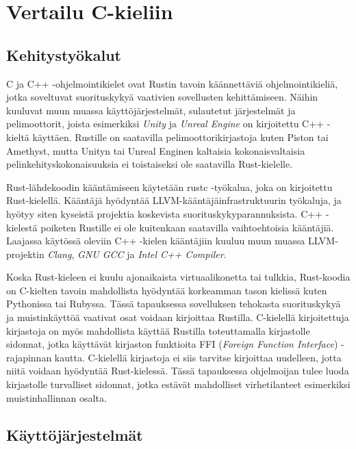 \documentclass[finnish]{tktltiki2}
\theoremstyle{definition}
\theoremstyle{remark}
\begin{document}
\section{Vertailu C-kieliin}

\subsection{Kehitystyökalut}

C ja C++ -ohjelmointikielet ovat Rustin tavoin käännettäviä ohjelmointikieliä, jotka soveltuvat suorituskykyä vaativien sovellusten kehittämiseen. Näihin kuuluvat muun muassa käyttöjärjestelmät, sulautetut järjestelmät ja pelimoottorit, joista esimerkiksi \textit{Unity} ja \textit{Unreal Engine} on kirjoitettu C++ -kieltä käyttäen. Rustille on saatavilla pelimoottorikirjastoja kuten Piston tai Amethyst, mutta Unityn tai Unreal Enginen kaltaisia kokonaisvaltaisia pelinkehityskokonaisuuksia ei toistaiseksi ole saatavilla Rust-kielelle.\cite{AreWeGameYetEngines}

Rust-lähdekoodin kääntämiseen käytetään rustc -työkalua, joka on kirjoitettu Rust-kielellä. Kääntäjä hyödyntää LLVM-kääntäjäinfrastruktuurin työkaluja, ja hyötyy siten kyseistä projektia koskevista suorituskykyparannuksista. \cite{RustFaq} C++ -kielestä poiketen Rustille ei ole kuitenkaan saatavilla vaihtoehtoisia kääntäjiä. Laajassa käytössä oleviin C++ -kielen kääntäjiin kuuluu muun muassa LLVM-projektin \textit{Clang}, \textit{GNU GCC} ja \textit{Intel C++ Compiler}.

Koska Rust-kieleen ei kuulu ajonaikaista virtuaalikonetta tai tulkkia, Rust-koodia on C-kielten tavoin mahdollista hyödyntää korkeamman tason kielissä kuten Pythonissa tai Rubyssa. Tässä tapauksessa sovelluksen tehokasta suorituskykyä ja muistinkäyttöä vaativat osat voidaan kirjoittaa Rustilla.\cite{RustInsideOtherLanguages} C-kielellä kirjoitettuja kirjastoja on myös mahdollista käyttää Rustilla toteuttamalla kirjastolle sidonnat, jotka käyttävät kirjaston funktioita FFI (\textit{Foreign Function Interface}) -rajapinnan kautta. C-kielellä kirjastoja ei siis tarvitse kirjoittaa uudelleen, jotta niitä voidaan hyödyntää Rust-kielessä. Tässä tapauksessa ohjelmoijan tulee luoda kirjastolle turvalliset sidonnat, jotka estävät mahdolliset virhetilanteet esimerkiksi muistinhallinnan osalta.

\subsection{Käyttöjärjestelmät}
\end{document}
